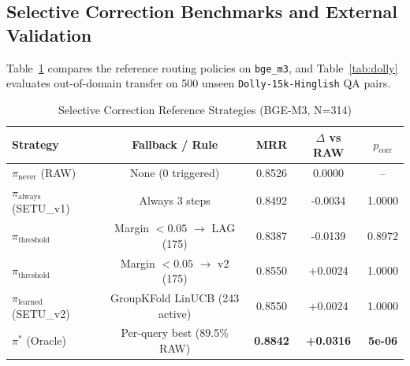 \documentclass[conference]{IEEEtran}
\begin{document}
\subsection{Selective Correction Benchmarks and External Validation}
Table~\ref{tab:selective} compares the reference routing policies on \texttt{bge\_m3}, and Table~\ref{tab:dolly} evaluates out-of-domain transfer on 500 unseen \texttt{Dolly-15k-Hinglish} QA pairs.

\begin{table}[t]
\caption{Selective Correction Reference Strategies (BGE-M3, N=314)}
\label{tab:selective}
\centering
\begin{tabular}{lcccc}
\toprule
Strategy & Fallback / Rule & MRR & $\Delta$ vs RAW & $p_{\text{corr}}$ \\
\midrule
$\pi_{\text{never}}$ (RAW) & None (0 triggered) & 0.8526 & 0.0000 & -- \\
$\pi_{\text{always}}$ (SETU\_v1) & Always 3 steps & 0.8492 & -0.0034 & 1.0000 \\
$\pi_{\text{threshold}}$ & Margin $<0.05$ $\to$ LAG (175) & 0.8387 & -0.0139 & 0.8972 \\
$\pi_{\text{threshold}}$ & Margin $<0.05$ $\to$ v2 (175) & 0.8550 & +0.0024 & 1.0000 \\
$\pi_{\text{learned}}$ (SETU\_v2) & GroupKFold LinUCB (243 active) & 0.8550 & +0.0024 & 1.0000 \\
$\pi^*$ (Oracle) & Per-query best (89.5\% RAW) & \textbf{0.8842} & \textbf{+0.0316} & \textbf{5e-06} \\
\bottomrule
\end{tabular}
\end{table}
\end{document}
